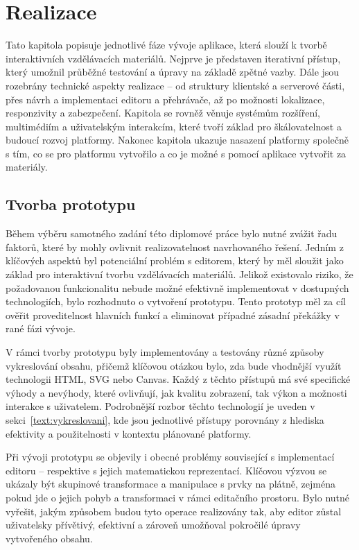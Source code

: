 \chapter{Realizace}

\begin{chapterabstract}
Tato kapitola popisuje jednotlivé fáze vývoje aplikace, která slouží k tvorbě interaktivních vzdělávacích materiálů. 
Nejprve je představen iterativní přístup, který umožnil průběžné testování a úpravy na základě zpětné vazby. 
Dále jsou rozebrány technické aspekty realizace -- od struktury klientské a serverové části, přes návrh a implementaci editoru a přehrávače, až po možnosti lokalizace, responzivity a zabezpečení. 
Kapitola se rovněž věnuje systémům rozšíření, multimédiím a uživatelským interakcím, které tvoří základ pro škálovatelnost a budoucí rozvoj platformy. 
Nakonec kapitola ukazuje nasazení platformy společně s tím, co se pro platformu vytvořilo a co je možné s pomocí aplikace vytvořit za materiály.
\end{chapterabstract}

\section{Tvorba prototypu}


Během výběru samotného zadání této diplomové práce bylo nutné zvážit řadu faktorů, které by mohly ovlivnit realizovatelnost navrhovaného řešení. 
Jedním z klíčových aspektů byl potenciální problém s editorem, který by měl sloužit jako základ pro interaktivní tvorbu vzdělávacích materiálů. 
Jelikož existovalo riziko, že požadovanou funkcionalitu nebude možné efektivně implementovat v dostupných technologiích, bylo rozhodnuto o vytvoření prototypu. 
Tento prototyp měl za cíl ověřit proveditelnost hlavních funkcí a eliminovat případné zásadní překážky v rané fázi vývoje.

V rámci tvorby prototypu byly implementovány a testovány různé způsoby vykreslování obsahu, přičemž klíčovou otázkou bylo, zda bude vhodnější využít technologii HTML, SVG nebo Canvas.
Každý z těchto přístupů má své specifické výhody a nevýhody, které ovlivňují, jak kvalitu zobrazení, tak výkon a možnosti interakce s uživatelem. 
Podrobnější rozbor těchto technologií je uveden v sekci~\ref{text:vykreslovani}, kde jsou jednotlivé přístupy porovnány z hlediska efektivity a použitelnosti v kontextu plánované platformy.

Při vývoji prototypu se objevily i obecné problémy související s implementací editoru -- respektive s jejich matematickou reprezentací. 
Klíčovou výzvou se ukázaly být skupinové transformace a manipulace s prvky na plátně, zejména pokud jde o jejich pohyb a transformaci v rámci editačního prostoru.
Bylo nutné vyřešit, jakým způsobem budou tyto operace realizovány tak, aby editor zůstal uživatelsky přívětivý, efektivní a zároveň umožňoval pokročilé úpravy vytvořeného obsahu.

